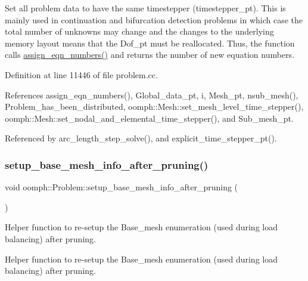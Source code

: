 Set all problem data to have the same timestepper (timestepper\+\_\+pt). This is mainly used in continuation and bifurcation detection problems in which case the total number of unknowns may change and the changes to the underlying memory layout means that the Dof\+\_\+pt must be reallocated. Thus, the function calls \hyperlink{classoomph_1_1Problem_a0df501c6aed60c4938861df776b10119}{assign\+\_\+eqn\+\_\+numbers()} and returns the number of new equation numbers. 

Definition at line 11446 of file problem.\+cc.



References assign\+\_\+eqn\+\_\+numbers(), Global\+\_\+data\+\_\+pt, i, Mesh\+\_\+pt, nsub\+\_\+mesh(), Problem\+\_\+has\+\_\+been\+\_\+distributed, oomph\+::\+Mesh\+::set\+\_\+mesh\+\_\+level\+\_\+time\+\_\+stepper(), oomph\+::\+Mesh\+::set\+\_\+nodal\+\_\+and\+\_\+elemental\+\_\+time\+\_\+stepper(), and Sub\+\_\+mesh\+\_\+pt.



Referenced by arc\+\_\+length\+\_\+step\+\_\+solve(), and explicit\+\_\+time\+\_\+stepper\+\_\+pt().

\mbox{\label{classoomph_1_1Problem_ab5f60ebc552c00ee681776bc7fa61203}} 
\subsubsection{\texorpdfstring{setup\+\_\+base\+\_\+mesh\+\_\+info\+\_\+after\+\_\+pruning()}{setup\_base\_mesh\_info\_after\_pruning()}}
{\footnotesize\ttfamily void oomph\+::\+Problem\+::setup\+\_\+base\+\_\+mesh\+\_\+info\+\_\+after\+\_\+pruning (\begin{DoxyParamCaption}{ }\end{DoxyParamCaption})\hspace{0.3cm}{\ttfamily [private]}}



Helper function to re-\/setup the Base\+\_\+mesh enumeration (used during load balancing) after pruning. 

Helper function to re-\/setup the Base\+\_\+mesh enumeration (used during load balancing) after pruning. 

